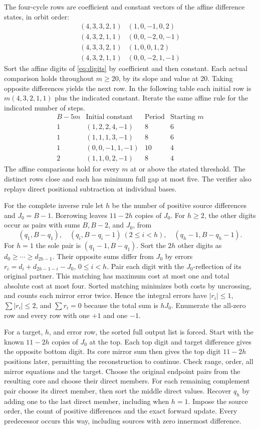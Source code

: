\documentclass[11pt,reqno]{amsart}
\theoremstyle{remark}
\begin{document}
The four-cycle rows are coefficient and constant vectors of the affine difference states, in orbit order:
\[
\begin{array}{cc}
(4,3,3,2,1)&(1,0,-1,0,2)\\
(4,3,2,1,1)&(0,0,-2,0,-1)\\
(4,3,3,2,1)&(1,0,0,1,2)\\
(4,3,2,1,1)&(0,0,-2,1,-1)
\end{array}
\]
Sort the affine digits of \eqref{eq:digits} by coefficient and then constant. Each actual comparison holds throughout \(m\ge20\), by its slope and value at 20. Taking opposite differences yields the next row. In the following table each initial row is \(m(4,3,2,1,1)\) plus the indicated constant. Iterate the same affine rule for the indicated number of steps.
\[
\begin{array}{cccc}
 B-5m &\text{Initial constant}&\text{Period}&\text{Starting }m\\
 1&(1,2,2,4,-1)&8&6\\
 1&(1,1,1,3,-1)&8&6\\
 1&(0,0,-1,1,-1)&10&4\\
 2&(1,1,0,2,-1)&8&4
\end{array}
\]
The affine comparisons hold for every \(m\) at or above the stated threshold. The distinct rows close and each has minimum full gap at most five. The verifier also replays direct positional subtraction at individual bases.

For the complete inverse rule let \(h\) be the number of positive source differences and \(J_0=B-1\). Borrowing leaves \(11-2h\) copies of \(J_0\). For \(h\ge2\), the other digits occur as pairs with sums \(B,B-2\), and \(J_0\), from
\[
 (q_1,B-q_1),\quad (q_i,B-q_i-1)\ (2\le i<h),\quad
 (q_h-1,B-q_h-1).
\]
For \(h=1\) the sole pair is \((q_1-1,B-q_1)\). Sort the \(2h\) other digits as \(d_0\ge\cdots\ge d_{2h-1}\). Their opposite sums differ from \(J_0\) by errors \(r_i=d_i+d_{2h-1-i}-J_0\), \(0\le i<h\). Pair each digit with the \(J_0\)-reflection of its original partner. This matching has maximum cost at most one and total absolute cost at most four. Sorted matching minimizes both costs by uncrossing, and counts each mirror error twice. Hence the integral errors have \(|r_i|\le1\), \(\sum|r_i|\le2\), and \(\sum r_i=0\) because the total sum is \(hJ_0\). Enumerate the all-zero row and every row with one \(+1\) and one \(-1\).

For a target, \(h\), and error row, the sorted full output list is forced. Start with the known \(11-2h\) copies of \(J_0\) at the top. Each top digit and target difference gives the opposite bottom digit. Its core mirror sum then gives the top digit \(11-2h\) positions later, permitting the reconstruction to continue. Check range, order, all mirror equations and the target. Choose the original endpoint pairs from the resulting core and choose their direct members. For each remaining complement pair choose its direct member, then sort the middle direct values. Recover \(q_h\) by adding one to the last direct member, including when \(h=1\). Impose the source order, the count of positive differences and the exact forward update. Every predecessor occurs this way, including sources with zero innermost difference.
\end{document}
